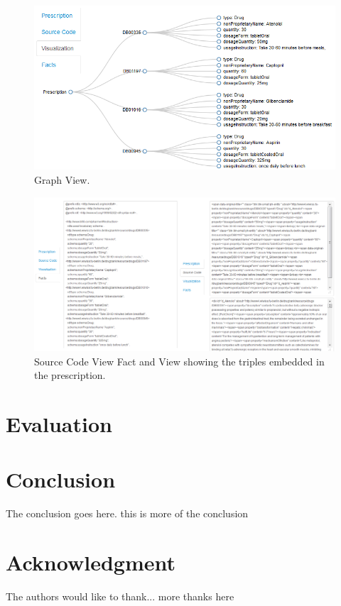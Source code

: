 \documentclass[10pt, conference, compsocconf]{IEEEtran}
\begin{document}
\begin{figure}[tb]
	\centering
		\includegraphics[width=1.0\columnwidth]{images/sc2.png}
	\caption{Graph View.}
	\label{fig:graphview}
\end{figure}

\begin{figure}[tb]
	\centering
		\includegraphics[width=2.0\columnwidth]{images/sc34.png}
	\caption{Source Code View Fact and View showing the triples embedded in the prescription.}
	\label{fig:codeview}
\end{figure}


\section{Evaluation}
\label{evaluation}

\section{Conclusion}
The conclusion goes here. this is more of the conclusion



\section*{Acknowledgment}


The authors would like to thank...
more thanks here








\end{document}
